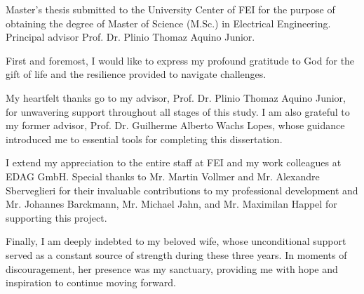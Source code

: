 \begin{folhaderosto}
Master's thesis submitted to the University Center of FEI for the purpose of obtaining the degree of Master of Science (M.Sc.) in Electrical Engineering. Principal advisor Prof. Dr. Plinio Thomaz Aquino Junior.
\end{folhaderosto}







\begin{agradecimentos}
First and foremost, I would like to express my profound gratitude to God for the gift of life and the resilience provided to navigate challenges.

My heartfelt thanks go to my advisor, Prof. Dr. Plinio Thomaz Aquino Junior, for unwavering support throughout all stages of this study. I am also grateful to my former advisor, Prof. Dr. Guilherme Alberto Wachs Lopes, whose guidance introduced me to essential tools for completing this dissertation.

I extend my appreciation to the entire staff at FEI and my work colleagues at EDAG GmbH. Special thanks to Mr. Martin Vollmer and Mr. Alexandre Sberveglieri for their invaluable contributions to my professional development and Mr. Johannes Barckmann, Mr. Michael Jahn, and Mr. Maximilan Happel for supporting this project.

Finally, I am deeply indebted to my beloved wife, whose unconditional support served as a constant source of strength during these three years. In moments of discouragement, her presence was my sanctuary, providing me with hope and inspiration to continue moving forward.
\end{agradecimentos}

\begin{epigrafe}
\end{epigrafe}